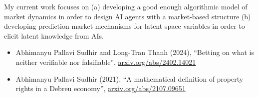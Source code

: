 \documentclass{article}
\begin{document}
My current work focuses on (a) developing  a good enough algorithmic model of market dynamics in order to design AI agents with a market-based structure (b) developing prediction market mechanisms for latent space variables in order to elicit latent knowledge from AIs.

\begin{itemize}

    \item
          Abhimanyu Pallavi Sudhir and Long-Tran Thanh (2024), ``Betting on what is neither verifiable nor falsifiable'', \href{https://arxiv.org/abs/2402.14021}{arxiv.org/abs/2402.14021}

    \item
          Abhimanyu Pallavi Sudhir (2021),
          ``A mathematical definition of property rights in a Debreu economy'',
          \href{https://arxiv.org/abs/2107.09651}{arxiv.org/abs/2107.09651}

\end{itemize}
\end{document}
